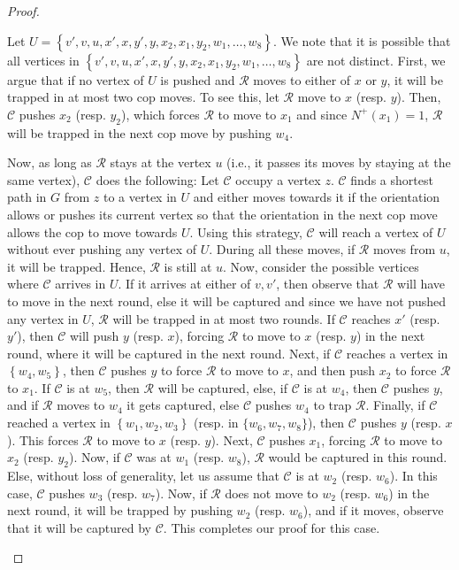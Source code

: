 \documentclass[a4paper,12pt]{amsart}
\newcommand{\set}[1]{\left\{#1\right\}}
\newcommand{\R}{\mathcal{R}}
\newcommand{\C}{\mathcal{C}}
\newenvironment{proofofclaim}{%
  \renewcommand{\proofname}{Proof of Claim}\proof}{\endproof}
\begin{document}
\begin{proof}
\begin{proofofclaim}
\begin{enumerate}
\begin{enumerate}
            Let $U = \set{v',v,u,x',x,y',y,x_2,x_1,y_2,w_1,\ldots,w_8}$. We note that it is possible that all vertices in $\set{v',v,u,x',x,y',y,x_2,x_1,y_2,w_1,\ldots,w_8}$ are not distinct. First, we argue that if no vertex of $U$ is pushed and $\R$ moves to either of $x$ or $y$, it will be trapped in at most two  cop moves. To see this, let $\R$ move to $x$ (resp. $y$). Then, $\C$ pushes $x_2$ (resp. $y_2$), which forces $\R$ to move to $x_1$ and since $N^+(x_1) =1$, $\R$ will be trapped in the next cop move by pushing $w_4$. 
            
            Now, as long as $\R$ stays at the vertex $u$ (i.e., it passes its moves by staying at the same vertex), $\C$ does the following: Let $\C$ occupy a vertex $z$. $\C$ finds a shortest path in $G$ from $z$ to a vertex in $U$ and either moves towards it if the orientation allows or pushes its current vertex so that the orientation in the next cop move allows the cop to move towards $U$. Using this strategy, $\C$ will reach a vertex of $U$ without ever pushing any vertex of  $U$. During all these moves, if $\R$ moves from $u$, it will be trapped. Hence, $\R$ is still at $u$. Now, consider the possible vertices where $\C$ arrives in $U$. If it arrives at either of $v,v'$, then observe that $\R$ will have to move in the next round, else it will be captured and since we have not pushed any vertex in $U$, $\R$ will be trapped in at most two rounds. If $\C$ reaches $x'$ (resp. $y'$), then $\C$ will push $y$ (resp. $x$), forcing $\R$ to move to $x$ (resp. $y$) in the next round, where it will be captured in the next round. Next, if $\C$ reaches a vertex in $\set{w_4,w_5}$, then $\C$ pushes $y$ to force $\R$ to move to $x$, and then push $x_2$ to force $\R$ to $x_1$. If $\C$ is at $w_5$, then $\R$ will be captured, else, if $\C$ is at $w_4$, then $\C$ pushes $y$, and if $\R$ moves to $w_4$ it gets captured, else $\C$ pushes $w_4$ to trap $\R$. Finally, if $\C$ reached a vertex in $\set{w_1,w_2,w_3}$ (resp. in $\{w_6,w_7,w_8\}$), then $\C$ pushes $y$ (resp. $x$). This forces $\R$ to move to $x$ (resp. $y$). Next, $\C$ pushes $x_1$, forcing $\R$ to move to $x_2$ (resp. $y_2$). Now, if $\C$ was at $w_1$ (resp. $w_8$), $\R$ would be captured in this round. Else, without loss of generality, let us assume that $\C$ is at $w_2$ (resp. $w_6$). In this case, $\C$ pushes $w_3$ (resp. $w_7$). Now, if $\R$ does not move to $w_2$ (resp. $w_6$) in the next round, it will be trapped by pushing $w_2$ (resp. $w_6$), and if it moves, observe that it will be captured by $\C$. This completes our proof for this case. 
            

\end{enumerate}
\end{enumerate}
\end{proofofclaim}
\end{proof}
\end{document}
